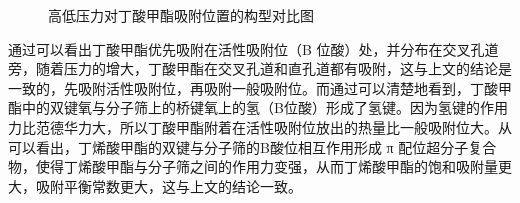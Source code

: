 \begin{figure}[H]
    \caption{高低压力对丁酸甲酯吸附位置的构型对比图}
    \label{fig:loaction}
\end{figure}
\par{通过可以看出丁酸甲酯优先吸附在活性吸附位（B 位酸）处，并分布在交叉孔道旁，随着压力的增大，丁酸甲酯在交叉孔道和直孔道都有吸附，这与上文的结论是一致的，先吸附活性吸附位，再吸附一般吸附位。而通过可以清楚地看到，丁酸甲酯中的双键氧与分子筛上的桥键氧上的氢（B位酸）形成了氢键。因为氢键的作用力比范德华力大，所以丁酸甲酯附着在活性吸附位放出的热量比一般吸附位大。从可以看出，丁烯酸甲酯的双键与分子筛的B酸位相互作用形成 π 配位超分子复合物\cite{C-2-C-5直链烯烃在HY和H-ZSM-5分子筛上的吸附}，使得丁烯酸甲酯与分子筛之间的作用力变强，从而丁烯酸甲酯的饱和吸附量更大，吸附平衡常数更大，这与上文的结论一致。}

